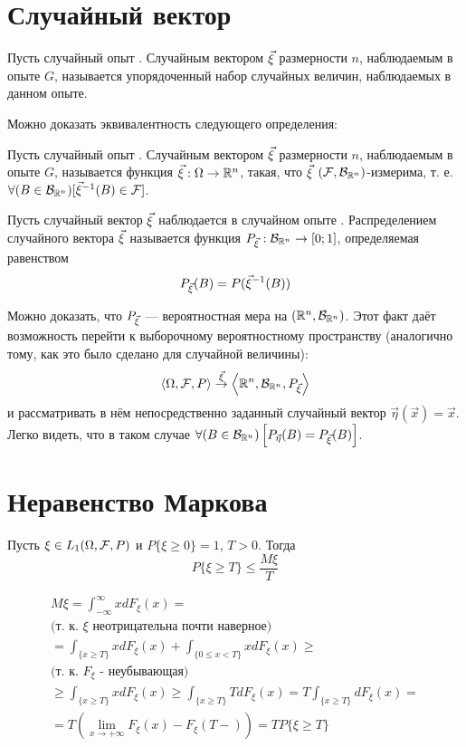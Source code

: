 \section{Случайный вектор}

\opred
Пусть случайный опыт \GOFP.
Случайным вектором ${\vec{\xi}}$ размерности $n$, наблюдаемым в опыте $G$, называется упорядоченный набор случайных величин, наблюдаемых в данном опыте.

Можно доказать эквивалентность следующего определения:

\opred
Пусть случайный опыт \GOFP.
Случайным вектором ${\vec{\xi}}$ размерности $n$, наблюдаемым в опыте $G$, называется функция ${\vec{\xi}}:\Omega\to\mathbb{R}^n$, такая,
что ${\vec{\xi}}$ $(\mathcal{F},\mathcal{B}_{\mathbb{R}^n})$-измерима, т. е. $\forall(B\in\mathcal{B}_{\mathbb{R}^n})[{\vec{\xi}}^{-1}(B)\in\mathcal{F}]$.

\opred
Пусть случайный вектор ${\vec{\xi}}$ наблюдается в случайном опыте \GOFP.
Распределением случайного вектора ${\vec{\xi}}$ называется функция $P_{\vec{\xi}} : \mathcal{B}_{\mathbb{R}^n} \to [0;1]$, определяемая равенством
$$
P_{\vec{\xi}}(B)=P({\vec{\xi}}^{-1}(B))
$$

Можно доказать, что $P_{\vec{\xi}}$ --- вероятностная мера на $(\mathbb{R}^n,\mathcal{B}_{\mathbb{R}^n})$.
Этот факт даёт возможность перейти к выборочному вероятностному пространству (аналогично тому, как это было сделано для случайной величины):
$$
\left<\Omega,\mathcal{F},P\right> \stackrel{{\vec{\xi}}}{\to} \left<\mathbb{R}^n, \mathcal{B}_{\mathbb{R}^n}, P_{\vec{\xi}}\right>
$$
и рассматривать в нём непосредственно заданный случайный вектор $\vec{\eta}(\vec{x})=\vec{x}$.
Легко видеть, что в таком случае $\forall(B\in\mathcal{B}_{\mathbb{R}^n})\left[P_{\vec{\eta}}(B)=P_{\vec{\xi}}(B)\right]$.







\section{Неравенство Маркова}
Пусть $\xi \in L_1(\Omega,\mathcal{F},P)$ и $P\{\xi \geq 0\}=1$, $T>0$.
Тогда 
\begin{equation}\label{neravenstvo Markova}
	P\{\xi \geq T\} \leq \frac{M\xi}{T}
\end{equation}

\dokvo
\begin{multline*}
M\xi = \int_{-\infty}^{\infty} x dF_\xi(x) =
\\
\mbox{(т. к. $\xi$ неотрицательна почти наверное)}
\\
=\int_{\{x \geq T\}} x dF_\xi(x) + \int_{\{0 \leq x < T\}} x dF_\xi(x) \geq 
\\
\mbox{(т. к. $F_\xi$ - неубывающая)} \\
\geq \int_{\{x \geq T\}} x dF_\xi(x) \geq \int_{\{x \geq T\}} T dF_\xi(x)
=T\int_{\{x \geq T\}} dF_\xi(x) = \\ =
T \left( \lim_{x\to+\infty} F_\xi(x) - F_\xi(T-)\right) = T P\{\xi\geq T\}
\end{multline*}

